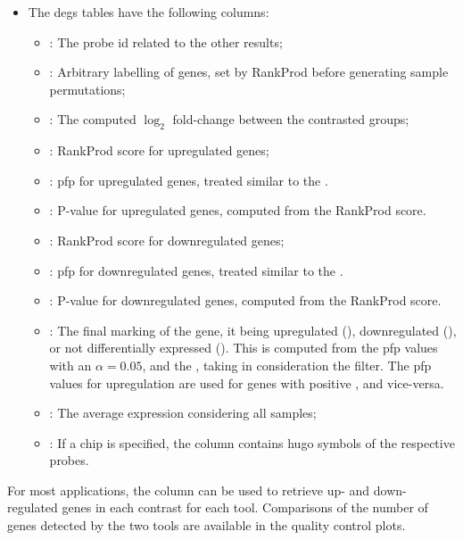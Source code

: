 \begin{itemize}
\begin{itemize}
\begin{itemize}
        \end{itemize}
        \item The  \glspl{deg} tables have the following columns:
        \begin{itemize}
            \item {}: The probe id related to the other results;
            \item {}: Arbitrary labelling of genes, set by RankProd before generating sample permutations;
            \item {}: The computed $\log_2$ fold-change between the contrasted groups;
            \item {}: RankProd score for upregulated genes;
            \item {}: \gls{pfp} for upregulated genes, treated similar to the  .
            \item {}: P-value for upregulated genes, computed from the RankProd score.
            \item {}: RankProd score for downregulated genes;
            \item {}: \gls{pfp} for downregulated genes, treated similar to the  .
            \item {}: P-value for downregulated genes, computed from the RankProd score.
            \item {}: The final marking of the gene, it being upregulated (), downregulated (), or not differentially expressed (). This is computed from the \gls{pfp} values with an $\alpha = 0.05$, and the , taking in consideration the  filter. The \gls{pfp} values for upregulation are used for genes with positive , and vice-versa.
            \item {}: The average expression considering all samples;
            \item {}: If a chip is specified, the  column contains \gls{hugo} symbols of the respective probes.
        \end{itemize}
    \end{itemize}
\end{itemize}

For most applications, the  column can be used to retrieve up- and down-regulated genes in each contrast for each tool. Comparisons of the number of genes detected by the two tools are available in the quality control plots.

